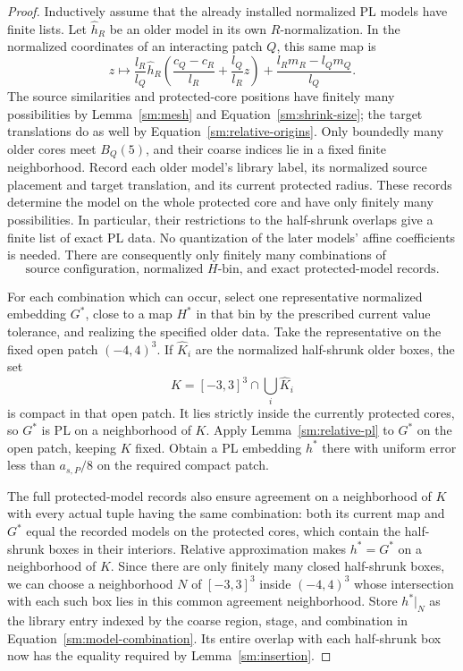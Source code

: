 \begin{proof}
Inductively assume that the already installed normalized PL models
have finite lists.  Let $\widehat h_R$ be an older model in its own
$R$-normalization.  In the normalized coordinates of an interacting
patch $Q$, this same map is
\begin{equation}
 \label{sm:transported-model}
 z\longmapsto
 \frac{l_R}{l_Q}\widehat h_R\!\left(
       \frac{c_Q-c_R}{l_R}+\frac{l_Q}{l_R}z\right)
       +\frac{l_Rm_R-l_Qm_Q}{l_Q}.
\end{equation}
The source similarities and protected-core positions have finitely
many possibilities by Lemma~\ref{sm:mesh} and
Equation~\eqref{sm:shrink-size}; the target translations do as well
by Equation~\eqref{sm:relative-origins}.  Only boundedly many older
cores meet $B_Q(5)$, and their coarse indices lie in a fixed finite
neighborhood.  Record each older model's library label, its
normalized source placement and target translation, and its current
protected radius.  These records determine the model on the whole
protected core and have only finitely many possibilities.  In
particular, their restrictions to the half-shrunk overlaps give a
finite list of exact PL data.  No quantization of the later models'
affine coefficients is needed.  There are consequently only finitely
many combinations of
\begin{equation}
 \label{sm:model-combination}
 \text{source configuration, normalized }H\text{-bin,
 and exact protected-model records}.
\end{equation}

For each combination which can occur, select one
representative normalized embedding $G^*$, close
to a map $H^*$ in that bin by the prescribed
current value tolerance, and realizing the
specified older data.  Take the representative
on the fixed open patch $(-4,4)^3$.  If
$\widehat K_i$ are the normalized half-shrunk
older boxes, the set
\[
 K=[-3,3]^3\cap\bigcup_i\widehat K_i
\]
is compact in that open patch.  It lies
strictly inside the currently protected
cores, so $G^*$ is PL on a neighborhood of
$K$.  Apply Lemma~\ref{sm:relative-pl} to
$G^*$ on the open patch, keeping $K$ fixed.
Obtain a PL embedding $h^*$ there with
uniform error less than $a_{s,P}/8$ on the
required compact patch.

The full protected-model records also ensure agreement on a
neighborhood of $K$ with every actual tuple having the same
combination: both its current map and $G^*$ equal the recorded
models on the protected cores, which contain the half-shrunk
boxes in their interiors.  Relative approximation makes $h^*=G^*$
on a neighborhood of $K$.  Since there are only finitely many
closed half-shrunk boxes, we can choose a neighborhood $N$ of
$[-3,3]^3$ inside $(-4,4)^3$ whose intersection with each such box
lies in this common agreement neighborhood.  Store $h^*|_N$ as the library
entry indexed by the coarse region, stage, and combination in
Equation~\eqref{sm:model-combination}.  Its entire overlap with
each half-shrunk box now has the equality required by
Lemma~\ref{sm:insertion}.


\end{proof}
